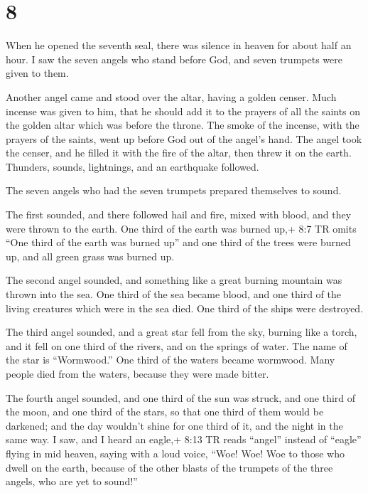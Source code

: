 \hypertarget{section-7}{%
\section{8}\label{section-7}}

 When he opened the seventh seal, there was silence in
heaven for about half an hour.  I saw the seven angels who
stand before God, and seven trumpets were given to them.

 Another angel came and stood over the altar, having a
golden censer. Much incense was given to him, that he should add it to
the prayers of all the saints on the golden altar which was before the
throne.  The smoke of the incense, with the prayers of the
saints, went up before God out of the angel's hand.  The
angel took the censer, and he filled it with the fire of the altar, then
threw it on the earth. Thunders, sounds, lightnings, and an earthquake
followed.

 The seven angels who had the seven trumpets prepared
themselves to sound.

 The first sounded, and there followed hail and fire, mixed
with blood, and they were thrown to the earth. One third of the earth
was burned up,+ 8:7 TR omits ``One third of the earth was burned up''
and one third of the trees were burned up, and all green grass was
burned up.

 The second angel sounded, and something like a great
burning mountain was thrown into the sea. One third of the sea became
blood,  and one third of the living creatures which were in
the sea died. One third of the ships were destroyed.

 The third angel sounded, and a great star fell from the
sky, burning like a torch, and it fell on one third of the rivers, and
on the springs of water.  The name of the star is
``Wormwood.'' One third of the waters became wormwood. Many people died
from the waters, because they were made bitter.

 The fourth angel sounded, and one third of the sun was
struck, and one third of the moon, and one third of the stars, so that
one third of them would be darkened; and the day wouldn't shine for one
third of it, and the night in the same way.  I saw, and I
heard an eagle,+ 8:13 TR reads ``angel'' instead of ``eagle'' flying in
mid heaven, saying with a loud voice, ``Woe! Woe! Woe to those who dwell
on the earth, because of the other blasts of the trumpets of the three
angels, who are yet to sound!''

